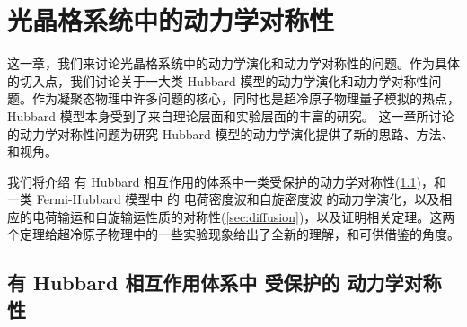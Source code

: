\chapter{光晶格系统中的动力学对称性}

这一章，我们来讨论光晶格系统中的动力学演化和动力学对称性的问题。作为具体的切入点，我们讨论关于一大类 Hubbard 模型的动力学演化和动力学对称性问题。作为凝聚态物理中许多问题的核心，同时也是超冷原子物理量子模拟的热点，Hubbard 模型本身受到了来自理论层面和实验层面的丰富的研究。 
这一章所讨论的动力学对称性问题为研究 Hubbard 模型的动力学演化提供了新的思路、方法、和视角。

我们将介绍 有 Hubbard 相互作用的体系中一类受保护的动力学对称性(\ref{sec:dynsymm})，和 一类 Fermi-Hubbard 模型中 的 电荷密度波和自旋密度波 的动力学演化，以及相应的电荷输运和自旋输运性质的对称性(\ref{sec:diffusion})，以及证明相关定理。这两个定理给超冷原子物理中的一些实验现象\cite{hubbard-expan-2010,hubbard-expan-2012,mbl1d,twobody-2017,charge-diffusion,spin-diffusion}给出了全新的理解，和可供借鉴的角度。



\section{有 Hubbard 相互作用体系中 受保护的 动力学对称性}\label{sec:dynsymm}

